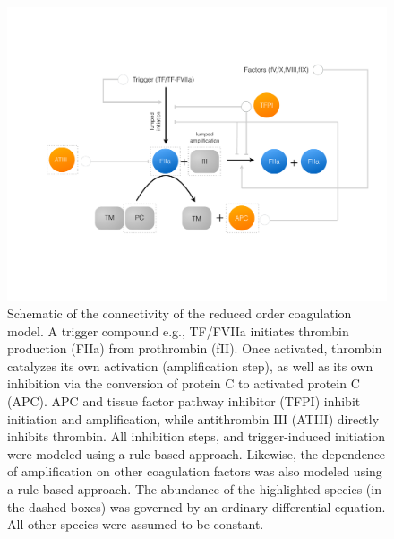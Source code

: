 \documentclass[12pt]{article}
\begin{document}
\begin{figure}
\centering
\includegraphics[width=1.0\textwidth]{./figs/Figure-1-Network.pdf}
\caption{Schematic of the connectivity of the reduced order coagulation model. A trigger compound e.g., TF/FVIIa initiates thrombin production (FIIa) from prothrombin (fII).
Once activated, thrombin catalyzes its own activation (amplification step), as well as its own inhibition via the conversion of protein C to activated protein C (APC).
APC and tissue factor pathway inhibitor (TFPI) inhibit initiation and amplification, while antithrombin III (ATIII) directly inhibits thrombin. 
All inhibition steps, and trigger-induced initiation were modeled using a rule-based approach. 
Likewise, the dependence of amplification on other coagulation factors was also modeled using a rule-based approach. 
The abundance of the highlighted species (in the dashed boxes) was governed by an ordinary differential equation. 
All other species were assumed to be constant.}\label{fig-network}
\end{figure}

\clearpage
\end{document}
